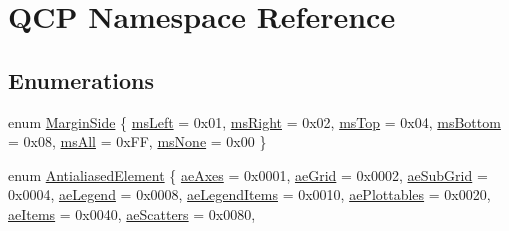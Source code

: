 \hypertarget{namespace_q_c_p}{}\section{Q\+CP Namespace Reference}
\label{namespace_q_c_p}
\subsection*{Enumerations}
\begin{DoxyCompactItemize}
\item 
enum \hyperlink{namespace_q_c_p_a7e487e3e2ccb62ab7771065bab7cae54}{Margin\+Side} \{ \newline
\hyperlink{namespace_q_c_p_a7e487e3e2ccb62ab7771065bab7cae54a9500c8bfcc9e80b9dff0a8e00e867f07}{ms\+Left} = 0x01, 
\hyperlink{namespace_q_c_p_a7e487e3e2ccb62ab7771065bab7cae54a93c719593bb2b94ed244d52c86d83b65}{ms\+Right} = 0x02, 
\hyperlink{namespace_q_c_p_a7e487e3e2ccb62ab7771065bab7cae54a5db8fb0d0b0ecf0d611c2602a348e8a0}{ms\+Top} = 0x04, 
\hyperlink{namespace_q_c_p_a7e487e3e2ccb62ab7771065bab7cae54a5241d8eac2bab9524a38889f576179cc}{ms\+Bottom} = 0x08, 
\newline
\hyperlink{namespace_q_c_p_a7e487e3e2ccb62ab7771065bab7cae54a43d7361cb0c5244eabdc962021bffebc}{ms\+All} = 0x\+FF, 
\hyperlink{namespace_q_c_p_a7e487e3e2ccb62ab7771065bab7cae54a80aa4149f16dabd538f8b2e3d42c42d5}{ms\+None} = 0x00
 \}
\item 
enum \hyperlink{namespace_q_c_p_ae55dbe315d41fe80f29ba88100843a0c}{Antialiased\+Element} \{ \newline
\hyperlink{namespace_q_c_p_ae55dbe315d41fe80f29ba88100843a0caefa92e89cd37f8a081fd2075aa1af73f}{ae\+Axes} = 0x0001, 
\hyperlink{namespace_q_c_p_ae55dbe315d41fe80f29ba88100843a0ca4fbb37118d62288af0ca601ff2b07a2f}{ae\+Grid} = 0x0002, 
\hyperlink{namespace_q_c_p_ae55dbe315d41fe80f29ba88100843a0caaedf83369188a15a69f92bb1d85ca97b}{ae\+Sub\+Grid} = 0x0004, 
\hyperlink{namespace_q_c_p_ae55dbe315d41fe80f29ba88100843a0ca9e0127a6361b5d0596b031a482c5cf97}{ae\+Legend} = 0x0008, 
\newline
\hyperlink{namespace_q_c_p_ae55dbe315d41fe80f29ba88100843a0ca1aca7a50c1b95403958733a4acafe773}{ae\+Legend\+Items} = 0x0010, 
\hyperlink{namespace_q_c_p_ae55dbe315d41fe80f29ba88100843a0ca4145e4251b0cf2dbedabeea0a38f84f6}{ae\+Plottables} = 0x0020, 
\hyperlink{namespace_q_c_p_ae55dbe315d41fe80f29ba88100843a0caf7712a85d6b0c75b24301d2fe9484db3}{ae\+Items} = 0x0040, 
\hyperlink{namespace_q_c_p_ae55dbe315d41fe80f29ba88100843a0cae45ed8cd167bffe27d7f40da4bc17e9c}{ae\+Scatters} = 0x0080, 

\end{DoxyCompactItemize}
